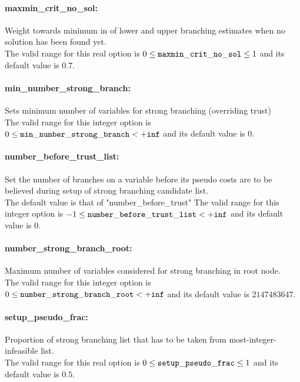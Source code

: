 \paragraph{maxmin\_crit\_no\_sol:} Weight towards minimum in of lower and upper branching estimates when no solution has been found yet. $\;$ \\
 The valid range for this real option is 
$0 \le {\tt maxmin\_crit\_no\_sol } \le 1$
and its default value is $0.7$.


\paragraph{min\_number\_strong\_branch:} Sets minimum number of variables for strong branching (overriding trust) $\;$ \\
 The valid range for this integer option is
$0 \le {\tt min\_number\_strong\_branch } <  {\tt +inf}$
and its default value is $0$.


\paragraph{number\_before\_trust\_list:} Set the number of branches on a variable before its pseudo costs are to be believed during setup of strong branching candidate list. $\;$ \\
 The default value is that of
"number\_before\_trust" The valid range for this integer option is
$-1 \le {\tt number\_before\_trust\_list } <  {\tt +inf}$
and its default value is $0$.


\paragraph{number\_strong\_branch\_root:} Maximum number of variables considered for strong branching in root node. $\;$ \\
 The valid range for this integer option is
$0 \le {\tt number\_strong\_branch\_root } <  {\tt +inf}$
and its default value is $2147483647$.


\paragraph{setup\_pseudo\_frac:} Proportion of strong branching list that has to be taken from most-integer-infeasible list. $\;$ \\
 The valid range for this real option is 
$0 \le {\tt setup\_pseudo\_frac } \le 1$
and its default value is $0.5$.


